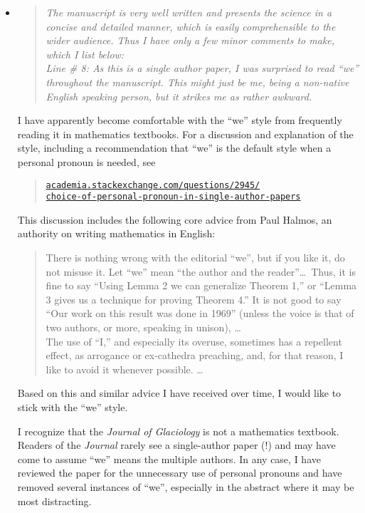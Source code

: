 \documentclass[11pt,reqno]{amsart}
\newcommand{\reply}[2]{
\medskip\medskip
\item  \begin{quote}
\emph{#1}
\end{quote}

\medskip
\noindent #2}
\begin{document}
\begin{itemize}
\reply{The manuscript is very well written and presents the science in a concise and detailed manner, which is easily comprehensible to the wider audience.  Thus I have only a few minor comments to make, which I list below:
\medskip \\
Line \# 8: As this is a single author paper, I was surprised to read ``we'' throughout the manuscript. This might just be me, being a non-native English speaking person, but it strikes me as rather awkward.}
{I have apparently become comfortable with the ``we'' style from frequently reading it in mathematics textbooks.  For a discussion and explanation of the style, including a recommendation that ``we'' is the default style when a personal pronoun is needed, see\begin{quote}
\href{http://academia.stackexchange.com/questions/2945/choice-of-personal-pronoun-in-single-author-papers}{\texttt{academia.stackexchange.com/questions/2945/\\ \phantom{foobar} choice-of-personal-pronoun-in-single-author-papers}}
\end{quote}
This discussion includes the following core advice from Paul Halmos, an authority on writing mathematics in English: \begin{quote} \medskip
There is nothing wrong with the editorial ``we'', but if you like it, do not misuse it.  Let ``we'' mean ``the author and the reader''\dots  \, Thus, it is fine to say ``Using Lemma 2 we can generalize Theorem 1,'' or ``Lemma 3 gives us a technique for proving Theorem 4.''  It is not good to say ``Our work on this result was done in 1969'' (unless the voice is that of two authors, or more, speaking in unison), \dots \medskip \\
\indent The use of ``I,'' and especially its overuse, sometimes has a repellent effect, as arrogance or ex-cathedra preaching, and, for that reason, I like to avoid it whenever possible. \dots \medskip
\end{quote}
Based on this and similar advice I have received over time, I would like to stick with the ``we'' style.

I recognize that the \emph{Journal of Glaciology} is not a mathematics textbook.  Readers of the \emph{Journal} rarely see a single-author paper (!) and may have come to assume ``we'' means the multiple authors.  In any case, I have reviewed the paper for the unnecessary use of personal pronouns and have removed several instances of ``we'', especially in the abstract where it may be most distracting.}


\end{itemize}
\end{document}

